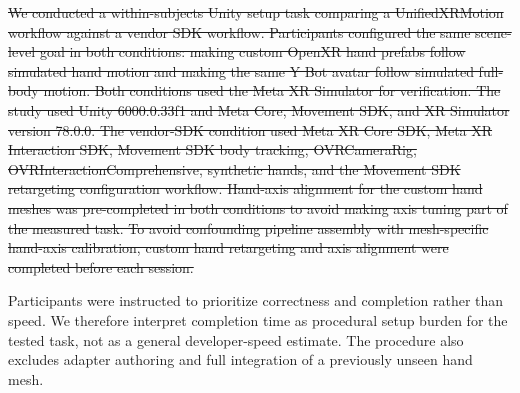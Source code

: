 \documentclass[runningheads]{llncs}
\newcommand{\rdel}[1]{\textcolor{revdel}{\sout{#1}}}
\newcommand{\rdel}[1]{}
\begin{document}
\rdel{
	We conducted a within-subjects Unity setup task comparing a UnifiedXRMotion workflow against a vendor SDK workflow. Participants configured the same scene-level goal in both conditions: making custom OpenXR hand prefabs follow simulated hand motion and making the same Y Bot avatar follow simulated full-body motion. Both conditions used the Meta XR Simulator for verification. The study used Unity 6000.0.33f1 and Meta Core, Movement SDK, and XR Simulator version 78.0.0.
	The vendor-SDK condition used Meta XR Core SDK, Meta XR Interaction SDK, Movement SDK body tracking, OVRCameraRig, OVRInteraction\allowbreak{}Comprehensive, synthetic hands, and the Movement SDK retargeting configuration workflow. Hand-axis alignment for the custom hand meshes was pre-completed in both conditions to avoid making axis tuning part of the measured task.
	To avoid confounding pipeline assembly with mesh-specific hand-axis calibration, custom hand retargeting and axis alignment were completed before each session.
}

Participants were instructed to prioritize correctness and completion rather than speed. We therefore interpret completion time as procedural setup burden for the tested task, not as a general developer-speed estimate. The procedure also excludes adapter authoring and full integration of a previously unseen hand mesh.
\end{document}
